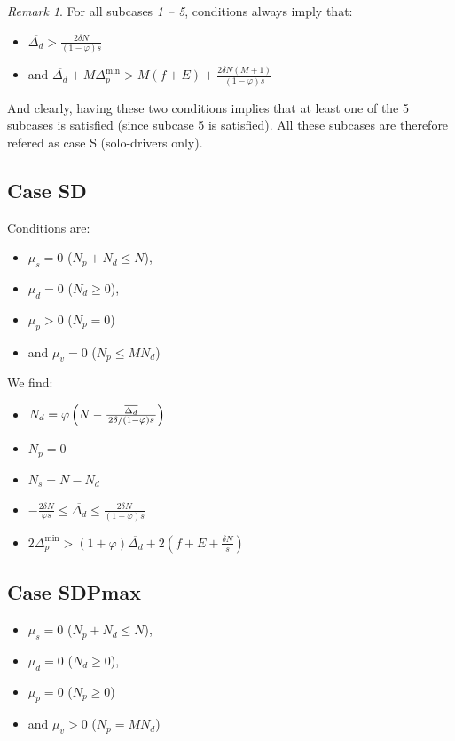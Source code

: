 \documentclass[english, a4paper]{article}
\theoremstyle{plain}
\theoremstyle{definition}
\theoremstyle{remark}
\newtheorem{remark}{Remark}
\begin{document}
\begin{remark}
    For all subcases \emph{1 -- 5}, conditions always imply that:

    \begin{itemize}
    \item $\overline{\Delta_d} >\frac{2\delta N}{(1 - \varphi) s}$
    \item and $\overline{\Delta_d} + M \Delta_p^{\text{min}} > M(f+ E) + \frac{2\delta N (M+1)}{(1 - \varphi) s}$
    \end{itemize}
\end{remark}

And clearly, having these two conditions implies that at least one of the 5 subcases is satisfied (since subcase 5 is satisfied). All these subcases are therefore refered as case S (solo-drivers only).



\subsection{Case SD}

Conditions are:
\begin{itemize}
    \item $\mu_s = 0$ ($N_p + N_d \leq N$),
    \item $\mu_d = 0$ ($N_d \geq 0$),
    \item $\mu_p > 0$ ($N_p = 0$)
    \item and $\mu_v = 0$ ($N_p \leq MN_d$)
\end{itemize}

We find:
\begin{itemize}
    \item $N_d = \varphi \left( N - \frac{\overline{\Delta_d}}{\left. 2\delta \middle/ (1-\varphi)s  \right.} \right)$
    \item $N_p = 0$
    \item $N_s = N - N_d$
    \item $-\frac{2\delta N}{\varphi s} \leq \overline{\Delta_d} \leq \frac{2\delta N}{(1-\varphi) s}$
    \item $2\Delta_p^{\text{min}} > (1 + \varphi)\overline{\Delta_d} + 2(f + E + \frac{\delta N}{s})$
\end{itemize}


\subsection{Case SDPmax}

\begin{itemize}
    \item $\mu_s = 0$ ($N_p + N_d \leq N$),
    \item $\mu_d = 0$ ($N_d \geq 0$),
    \item $\mu_p = 0$ ($N_p \geq 0$)
    \item and $\mu_v > 0$ ($N_p = MN_d$)
\end{itemize}
\end{document}
